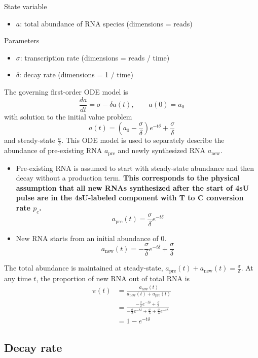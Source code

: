 \documentclass[11pt]{article}
\begin{document}
State variable
\begin{itemize}
    \item $a$: total abundance of RNA species (dimensions = reads)
\end{itemize}
Parameters
\begin{itemize}
    \item $\sigma$: transcription rate (dimensions = reads / time)
    \item $\delta$: decay rate (dimensions = 1 / time)
\end{itemize}
The governing first-order ODE model is
$$
\frac{da}{dt} = \sigma - \delta a(t), \qquad a(0) = a_0
$$
with solution to the initial value problem
$$
a(t) = \left(a_0 - \frac{\sigma}{\delta} \right) e^{-t \delta} + \frac{\sigma}{\delta}
$$
and steady-state $\frac{\sigma}{\delta}$. This ODE model is used to separately describe the abundance of pre-existing RNA $a_\text{pre}$ and newly synthesized RNA $a_\text{new}$.
\begin{itemize}
\item Pre-existing RNA is assumed to start with steady-state abundance and then decay without a production term. \textbf{This corresponds to the physical assumption that all new RNAs synthesized after the start of 4sU pulse are in the 4sU-labeled component with T to C conversion rate $p_c$.}
  $$
  a_\text{pre}(t) = \frac{\sigma}{\delta} e^{-t \delta}
  $$
\item New RNA starts from an initial abundance of 0.
  $$
  a_\text{new}(t) = - \frac{\sigma}{\delta} e^{-t \delta} + \frac{\sigma}{\delta}
  $$
\end{itemize}
The total abundance is maintained at steady-state, $a_\text{pre}(t) + a_\text{new}(t) = \frac{\sigma}{\delta}$. At any time $t$, the proportion of new RNA out of total RNA is
$$
\begin{aligned}
\pi(t)
&= \frac{a_\text{new}(t)}{a_\text{new}(t) + a_\text{pre}(t)} \\
&= \frac{- \frac{\sigma}{\delta} e^{-t \delta} + \frac{\sigma}{\delta}}{- \frac{\sigma}{\delta} e^{-t \delta} + \frac{\sigma}{\delta} + \frac{\sigma}{\delta} e^{-t \delta}} \\
&= 1 - e^{-t \delta}
\end{aligned}
$$

\subsection{Decay rate}
\end{document}
